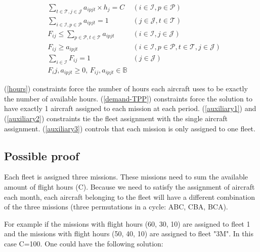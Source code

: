 \documentclass[a4paper,11pt]{article}
\begin{document}
    \begin{align}
        & \sum_{t \in \mathcal{T}, j \in \mathcal{J}} a_{ipjt} \times h_j = C & (i \in \mathcal{I}, p \in \mathcal{P}) \label{hours}\\
        & \sum_{i \in \mathcal{I}, p \in \mathcal{P}} a_{ipjt} = 1 & (j \in \mathcal{J}, t \in \mathcal{T}) \label{demand-TPP}\\
        & F_{ij} \leq \sum_{p \in \mathcal{P}, t \in \mathcal{T}} a_{ipjt} & (i \in \mathcal{I}, j \in \mathcal{J}) \label{auxiliary1}\\
        & F_{ij} \geq a_{ipjt} & (i \in \mathcal{I}, p \in \mathcal{P}, t \in \mathcal{T}, j \in \mathcal{J}) \label{auxiliary2}\\
        & \sum_{i \in \mathcal{I}} F_{ij} = 1 &  (j \in \mathcal{J}) \label{auxiliary3}\\
        & F_ij, a_{ipjt} \geq 0,\, F_{ij}, a_{ipjt} \in \mathbb{B}
    \end{align}

    (\ref{hours}) constraints force the number of hours each aircraft uses to be exactly the number of available hours.
    (\ref{demand-TPP}) constraints force the solution to have exactly 1 aircraft assigned to each mission at each period.
    (\ref{auxiliary1}) and (\ref{auxiliary2}) constraints tie the fleet assignment with the single aircraft assignment.
    (\ref{auxiliary3}) controls that each mission is only assigned to one fleet.

    \subsection{Possible proof}

    Each fleet is assigned three missions. These missions need to sum the available amount of flight hours (C).
    Because we need to satisfy the assignment of aircraft each month, each aircraft belonging to the fleet will have a different combination of the three missions (three permutations in a cycle: ABC, CBA, BCA).

    For example if the missions with flight hours (60, 30, 10) are assigned to fleet 1 and the missions with flight hours (50, 40, 10) are assigned to fleet "3M". In this case C=100. One could have the following solution:
\end{document}

